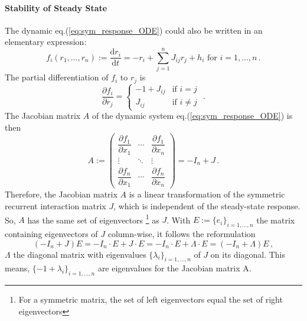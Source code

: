 \documentclass[11pt]{article}
\begin{document}
	\paragraph{Stability of Steady State}
	The dynamic eq.(\ref{eq:sym_response_ODE}) could also be written in an elementary expression:
		\begin{equation}
			 f_i (r_1, ..., r_n) := \frac{\mathrm{d} r_i}{\mathrm{d} t} = - r_i + \sum_{j=1}^{n} J_{ij} r_j + h_i  \text{   for } i = 1, ..., n\, .
		\end{equation}
	The partial differentiation of $f_i$ to $r_j$ is
		\begin{equation}
			\frac{\partial f_i}{\partial r_j} = 
			\begin{cases}
				-1 + J_{ij} & \text{if} \, \,  i = j \\
				J_{ij} & \text{if} \, \, i \neq j
			\end{cases} \, \, .
		\end{equation}
	The Jacobian matrix $A$ of the dynamic system eq.(\ref{eq:sym_response_ODE}) is then
		\begin{equation} \label{eq:Jacobian_matrix}
			A := 
			 \begin{pmatrix}
				\dfrac{\partial f_1}{\partial x_1} & \cdots & \dfrac{\partial f_1}{\partial x_n}\\
				\vdots                             & \ddots & \vdots\\
				\dfrac{\partial f_n}{\partial x_1} & \cdots & \dfrac{\partial f_n}{\partial x_n}
			\end{pmatrix}
			= - I_n + J \, .
		\end{equation}
	Therefore, the Jacobian matrix $A$ is a linear transformation of the symmetric recurrent interaction matrix $J$, which is independent of the steady-state response. So, $A$ has the same set of eigenvectors \footnote{For a symmetric matrix, the set of left eigenvectors equal the set of right eigenvectors} as $J$. With $E := \{e_i\}_{i = 1, ..., n}$ the matrix containing eigenvectors of $J$ column-wise, it follows the reformulation 
		\begin{equation} \label{eq:steady_state_eigenvalues_sym}
			(- I_n + J) E = - I_n \cdot E + J \cdot E = -I_n \cdot E + \Lambda \cdot E = (-I_n + \Lambda) E \, ,
		\end{equation}
	$\Lambda$ the diagonal matrix with eigenvalues $\{\lambda_i\}_{i = 1,...,n}$ of $J$ on its diagonal. This means, $\{-1 + \lambda_i\}_{i=1, ..., n}$ are eigenvalues for the Jacobian matrix A. 
	
\end{document}
